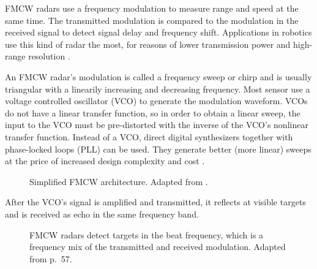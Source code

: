 FMCW radars use a frequency modulation to measure range and speed at the
same time. The transmitted modulation is compared to the modulation in
the received signal to detect signal delay and frequency shift.
Applications in robotics use this kind of radar the most, for reasons of
lower transmission power and high-range resolution \cite{Adams2012}.

An FMCW radar's modulation is called a frequency sweep or chirp and is
usually triangular with a linearily increasing and decreasing frequency.
Most sensor use a voltage controlled oscillator (VCO) to generate the
modulation waveform. VCOs do not have a linear transfer function, so in
order to obtain a linear sweep, the input to the VCO must be
pre-distorted with the inverse of the VCO's nonlinear transfer function.
Instead of a VCO, direct digital synthesizers together with phase-locked
loops (PLL) can be used. They generate better (more linear) sweeps at
the price of increased design complexity and cost \cite{Ernst2016}.

\begin{figure}[htp]
    \centering
    \def\svgwidth{\linewidth}
    
    \caption{\label{fig:fmcw_blocks}Simplified FMCW architecture. Adapted from \cite{VanZeijl2014}.}
\end{figure}

After the VCO's signal is amplified and transmitted, it reflects at
visible targets and is received as echo in the same frequency band.

\begin{figure}[htp]
    \centering
    \def\svgwidth{10cm}
    
    \caption{\label{fig:fmcw_triangular}FMCW radars detect targets in the beat frequency, which is a frequency mix of the transmitted and received modulation. Adapted from \cite{Adams2012} p.~57.}
\end{figure}

